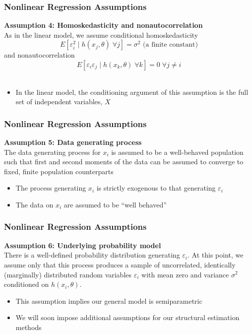 \documentclass{beamer}
\begin{document}
\begin{frame}\frametitle{Nonlinear Regression Assumptions}
    \textbf{Assumption 4: Homoskedasticity and nonautocorrelation} \\
    \vspace{3ex}
    As in the linear model, we assume conditional homoskedasticity
    $$E[\varepsilon_i^2 \mid h(x_j, \theta) \; \forall j] = \sigma^2 \text{ (a finite constant)}$$
    and nonautocorrelation
    $$E[\varepsilon_i \varepsilon_j \mid h(x_k, \theta) \; \forall k] = 0 \; \forall j \neq i$$ \\
    \begin{itemize}
        \item In the linear model, the conditioning argument of this assumption is the full set of independent variables, $X$
    \end{itemize}
\end{frame}

\begin{frame}\frametitle{Nonlinear Regression Assumptions}
    \textbf{Assumption 5: Data generating process} \\
    \vspace{3ex}
    The data generating process for $x_i$ is assumed to be a well-behaved population such that first and second moments of the data can be assumed to converge to fixed, finite population counterparts
    \begin{itemize}
        \item The process generating $x_i$ is strictly exogenous to that generating $\varepsilon_i$
        \item The data on $x_i$ are assumed to be ``well behaved''
    \end{itemize}
\end{frame}

\begin{frame}\frametitle{Nonlinear Regression Assumptions}
    \textbf{Assumption 6: Underlying probability model} \\
    \vspace{3ex}
    There is a well-defined probability distribution generating $\varepsilon _i$. At this point, we assume only that this process produces a sample of uncorrelated, identically (marginally) distributed random variables $\varepsilon_i$ with mean zero and variance $\sigma^2$ conditioned on $h(x_i, \theta)$.
    \begin{itemize}
        \item This assumption implies our general model is semiparametric
        \item We will soon impose additional assumptions for our structural estimation methods
    \end{itemize}
\end{frame}
\end{document}
